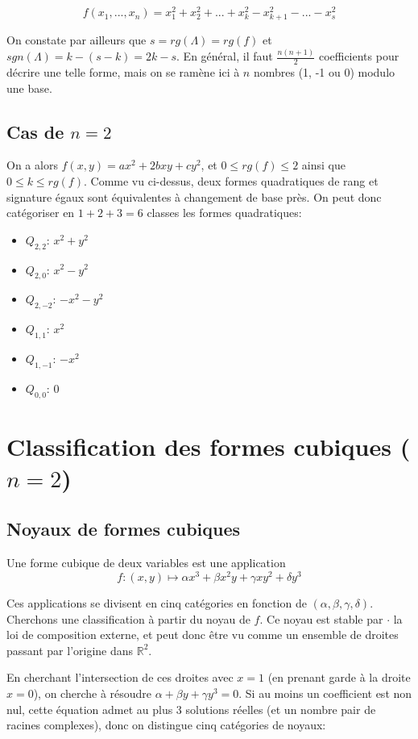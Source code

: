 \documentclass{article}
\begin{document}
$$f(x_1,...,x_n)=x_1^2+x_2^2+...+x_k^2-x_{k+1}^2-...-x_s^2$$

On constate par ailleurs que $s=rg(\Lambda)=rg(f)$ et $sgn(\Lambda)=k-(s-k)=2k-s$. En général, il faut $\frac{n(n+1)}{2}$ coefficients pour décrire une telle forme, mais on se ramène ici à $n$ nombres (1, -1 ou 0) modulo une base.

\subsection{Cas de $n=2$}

On a alors $f(x,y)=ax^2+2bxy+cy^2$, et $0\leq rg(f)\leq 2$ ainsi que $0\leq k\leq rg(f)$. Comme vu ci-dessus, deux formes quadratiques de rang et signature égaux sont équivalentes à changement de base près. On peut donc catégoriser en $1+2+3=6$ classes les formes quadratiques:


\begin{itemize}
\item  $Q_{2,2}$: $x^2+y^2$
\item  $Q_{2,0}$: $x^2-y^2$
\item  $Q_{2,-2}$: $-x^2-y^2$
\item  $Q_{1,1}$: $x^2$
\item  $Q_{1,-1}$: $-x^2$
\item  $Q_{0,0}$: $0$

\end{itemize}

\section{Classification des formes cubiques ($n=2$)}

\subsection{Noyaux de formes cubiques}

Une forme cubique de deux variables est une application $$f: (x,y) \mapsto \alpha x^3+\beta x^2y+\gamma xy^2+\delta y^3$$

Ces applications se divisent en cinq catégories en fonction de $(\alpha,\beta,\gamma,\delta)$. Cherchons une classification à partir du noyau de $f$. Ce noyau est stable par $\cdot$ la loi de composition externe, et peut donc être vu comme un ensemble de droites passant par l'origine dans $\mathbb{R}^2$.

En cherchant l'intersection de ces droites avec $x=1$ (en prenant garde à la droite $x=0$), on cherche à résoudre $\alpha+\beta y+\gamma y^3=0$. Si au moins un coefficient est non nul, cette équation admet au plus 3 solutions réelles (et un nombre pair de racines complexes), donc on distingue cinq catégories de noyaux:
\end{document}
